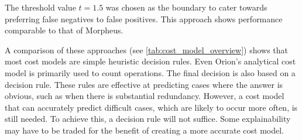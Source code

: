 The threshold value $t = 1.5 $ was chosen as the boundary to cater towards preferring false negatives to false positives. This approach shows performance comparable to that of Morpheus.

A comparison of these approaches (see \autoref{tab:cost_model_overview}) shows that most cost models are simple heuristic decision rules. Even Orion's analytical cost model is primarily used to count operations. The final decision is also based on a decision rule. These rules are effective at predicting cases where the answer is obvious, such as when there is substantial redundancy. However, a cost model that can accurately predict difficult cases, which are likely to occur more often, is still needed. To achieve this, a decision rule will not suffice. Some explainability may have to be traded for the benefit of creating a more accurate cost model.

